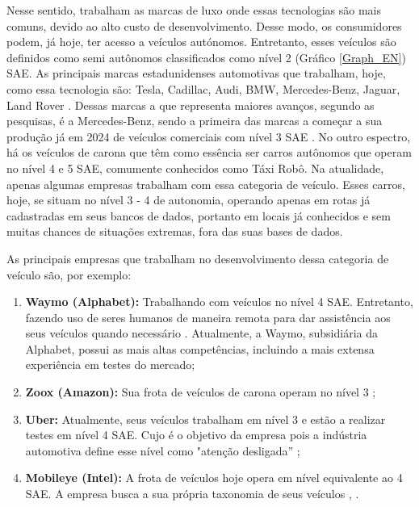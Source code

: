Nesse sentido, trabalham as marcas de luxo onde essas tecnologias são mais comuns, devido ao alto custo de desenvolvimento. Desse modo, os consumidores podem, já hoje, ter acesso a veículos autónomos. Entretanto, esses veículos são definidos como semi autônomos classificados como nível 2 (Gráfico \ref{Graph_EN}) SAE. As principais marcas estadunidenses automotivas que trabalham, hoje, como essa tecnologia são:  Tesla, Cadillac, Audi, BMW, Mercedes-Benz, Jaguar, Land Rover \cite{caio}. 
Dessas marcas a que representa maiores avanços, segundo as pesquisas, é a Mercedes-Benz, sendo  a primeira das marcas a começar a sua produção já em 2024 de veículos comerciais com nível 3 SAE \cite{mercedes3}.
No outro espectro, há os veículos de carona que têm como essência ser carros autônomos que operam no nível 4 e 5 SAE, comumente conhecidos como Táxi Robô. Na atualidade, apenas algumas empresas trabalham com essa categoria de veículo. Esses carros, hoje, se situam no nível 3 - 4 de autonomia, operando apenas em rotas já cadastradas em seus bancos de dados, portanto em locais já conhecidos e sem muitas chances de situações extremas, fora das suas bases de dados. 

As principais empresas que trabalham no desenvolvimento dessa categoria de veículo são, por exemplo:

\begin{enumerate}

   \item \textbf{Waymo (Alphabet):}
         Trabalhando com veículos no nível 4 SAE. Entretanto, fazendo uso de seres humanos de maneira remota para dar assistência aos seus veículos quando necessário \cite{waymo}. Atualmente, a Waymo, subsidiária da Alphabet, possui as mais altas competências, incluindo a mais extensa experiência em testes do mercado\cite{CAM};
   \item \textbf{Zoox (Amazon):}
         Sua frota de veículos de carona operam no nível 3 \cite{zoox};
   \item \textbf{Uber:}
         Atualmente, seus veículos trabalham em nível 3 e estão a realizar testes em nível 4 SAE. Cujo é o objetivo da empresa pois a indústria automotiva define esse nível como "atenção desligada” \cite{uber};
   \item \textbf{Mobileye (Intel):}
         A frota de veículos hoje opera em nível equivalente ao 4 SAE. A empresa busca a sua própria taxonomia de seus veículos \cite{mobileye}, \cite{mobileye1}.
\end{enumerate}

